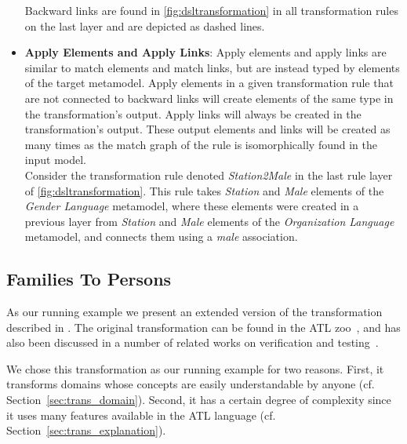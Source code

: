\begin{itemize}
Backward links are found in \cref{fig:dsltransformation} in all transformation rules on the last layer and are depicted as dashed lines.\\


\item \textbf{Apply Elements and Apply Links}: Apply elements and apply links are similar to match elements and
match links, but are instead typed by elements of the target metamodel. Apply elements in a given transformation rule that are not connected to backward links will create elements of the same type in the transformation's output. Apply links will always be created in the transformation's output. These output elements and links will be created as many times as the match graph of the rule is isomorphically found in the input model.\\

Consider the transformation rule denoted \emph{Station2Male} in the last rule
layer of \cref{fig:dsltransformation}. This rule takes \emph{Station} and
\emph{Male} elements of the \emph{Gender Language} metamodel, where these
elements were created in a previous layer from \emph{Station} and \emph{Male}
elements of the \emph{Organization Language} metamodel, and connects them using a
\emph{male} association.

\end{itemize}


\subsection{Families To Persons}
\label{subsec:fam_to_persons_example}

As our running example we present an extended version of the \FTP
transformation described in \cite{Oakes2015}. The original \FTP transformation can be
found in the ATL zoo~\cite{atlZoo}, and has also been discussed in a number of related works
on verification and testing~\cite{Gogolla2011}.

We chose this \FTP transformation as our running example for two reasons. First, it transforms domains whose concepts are easily understandable by anyone (cf. Section~\ref{sec:trans_domain}).
Second, it has a certain degree of complexity since it uses many features available in the ATL language (cf. Section~\ref{sec:trans_explanation}).

